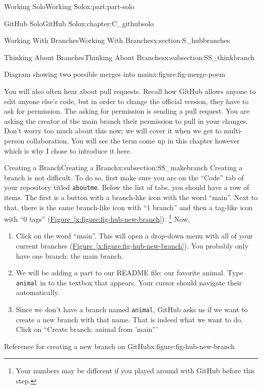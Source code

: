 \documentclass[oneside,10pt,]{book}
\newcommand{\xreffont}{\relax}
\newcommand{\mono}[1]{\texttt{#1}}
\begin{document}
\begin{partptx}{Working Solo}{}{Working Solo}{}{}{x:part:part-solo}
\begin{chapterptx}{GitHub Solo}{}{GitHub Solo}{}{}{x:chapter:C_githubsolo}
\begin{sectionptx}{Working With Branches}{}{Working With Branches}{}{}{x:section:S_hubbranches}
\begin{subsectionptx}{Thinking About Branches}{}{Thinking About Branches}{}{}{x:subsection:SS_thinkbranch}
\begin{figureptx}{Diagram showing two possible merges into main}{x:figure:fig-merge-poem}{}
\begin{image}{0.05}{0.9}{0.05}
\end{image}%
\tcblower
\end{figureptx}%
You will also often hear about pull requests. Recall how GitHub allows anyone to edit anyone else's code, but in order to change the official version, they have to ask for permission. The asking for permission is sending a pull request. You are asking the creator of the main branch their permission to pull in your changes. Don't worry too much about this now; we will cover it when we get to multi-person collaboration. You will see the term come up in this chapter however which is why I chose to introduce it here.%
\end{subsectionptx}
%
%
\typeout{************************************************}
\typeout{************************************************}
%
\begin{subsectionptx}{Creating a Branch}{}{Creating a Branch}{}{}{x:subsection:SS_makebranch}
%
%
Creating a branch is not difficult. To do so, first make sure you are on the ``Code'' tab of your repository titled \mono{aboutme}. Below the list of tabs, you should have a row of items. The first is a button with a branch-like icon with the word ``main''. Next to that, there is the same branch-like icon with ``1 branch'' and then a tag-like icon with ``0 tags'' (\hyperref[x:figure:fig-hub-new-branch]{Figure~{\xreffont\ref{x:figure:fig-hub-new-branch}}}). \footnote{Your numbers may be different if you played around with GitHub before this step.\label{g:fn:idm480196440}} Now,%
\begin{enumerate}
\item{}Click on the word ``main''. This will open a drop-down menu with all of your current branches (\hyperref[x:figure:fig-hub-new-branch]{Figure~{\xreffont\ref{x:figure:fig-hub-new-branch}}}). You probably only have one branch: the main branch.%
\item{}We will be adding a part to our README file: our favorite animal. Type \mono{animal} in to the textbox that appears. Your cursor should navigate their automatically.%
\item{}Since we don't have a branch named \mono{animal}, GitHub asks us if we want to create a new branch with that name. That is indeed what we want to do. Click on ``Create branch: animal from 'main'''%
\end{enumerate}
%
\begin{figureptx}{Reference for creating a new branch on GitHub}{x:figure:fig-hub-new-branch}{}%

\end{figureptx}
\end{subsectionptx}
\end{sectionptx}
\end{chapterptx}
\end{partptx}
\end{document}

